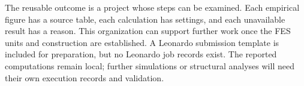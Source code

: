 The reusable outcome is a project whose steps can be examined. Each empirical figure has a source table, each calculation has settings, and each unavailable result has a reason. This organization can support further work once the FES units and construction are established. A Leonardo submission template is included for preparation, but no Leonardo job records exist. The reported computations remain local; further simulations or structural analyses will need their own execution records and validation.
